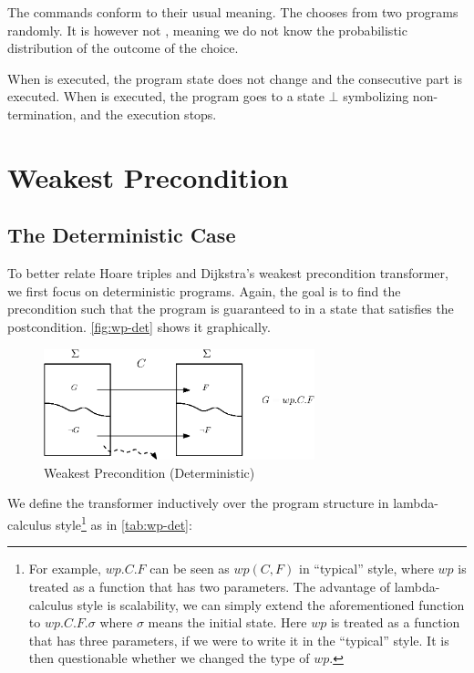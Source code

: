 The  commands conform to their usual meaning.
The   chooses from two programs randomly. 
It is however not , meaning we do not know the probabilistic distribution of the outcome of the choice. 

When  is executed, the program state does not change and the consecutive part is executed. 
When  is executed, the program goes to a state $\bot$ symbolizing non-termination, and the execution stops. 


\section{Weakest Precondition}\label{sec:wp}

\subsection{The Deterministic Case}\label{sec:wp-det}
To better relate Hoare triples and Dijkstra's weakest precondition transformer, we first focus on deterministic programs. 
Again, the goal is to find the  precondition such that the program is guaranteed to  in a state that satisfies the postcondition. 
\autoref{fig:wp-det} shows it graphically. 

\begin{figure}[ht!]\centering
\includegraphics[width=0.7\textwidth]{image/wp-det.eps}
\caption{Weakest Precondition (Deterministic)}
\label{fig:wp-det}
\end{figure}

We define the  transformer inductively over the program structure in lambda-calculus style\footnote{For example, $wp.C.F$ can be seen as $wp(C,F)$ in ``typical'' style, where $wp$ is treated as a function that has two parameters. The advantage of lambda-calculus style is scalability, we can simply extend the aforementioned function to $wp.C.F.\sigma$ where $\sigma$ means the initial state. Here $wp$ is treated as a function that has three parameters, if we were to write it in the ``typical'' style. It is then questionable whether we changed the type of $wp$. } as in \autoref{tab:wp-det}: 

